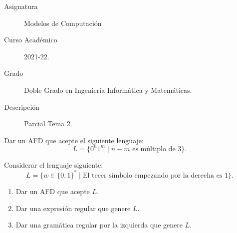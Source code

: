 \documentclass[12pt]{article}
\begin{document}

    
    

    \begin{description}
        \item[Asignatura] Modelos de Computación
        \item[Curso Académico] 2021-22.
        \item[Grado] Doble Grado en Ingeniería Informática y Matemáticas.
        \item[Descripción] Parcial Tema 2.
    \end{description}
    \newpage
    
    \begin{ejercicio}
        Dar un AFD que acepte el siguiente lenguaje:
        \begin{equation*}
            L=\{0^n1^m \mid n-m \text{ es múltiplo de } 3\}.
        \end{equation*}
    \end{ejercicio}

    \begin{ejercicio}
        Considerar el lenguaje siguiente:
        \begin{equation*}
            L=\{w \in \{0,1\}^* \mid \text{El tecer símbolo empezando por la derecha es } 1\}.
        \end{equation*}
        \begin{enumerate}
            \item Dar un AFD que acepte $L$.
            \item Dar una expresión regular que genere $L$.
            \item Dar una gramática regular por la izquierda que genere $L$.
        \end{enumerate}
    \end{ejercicio}
\end{document}
